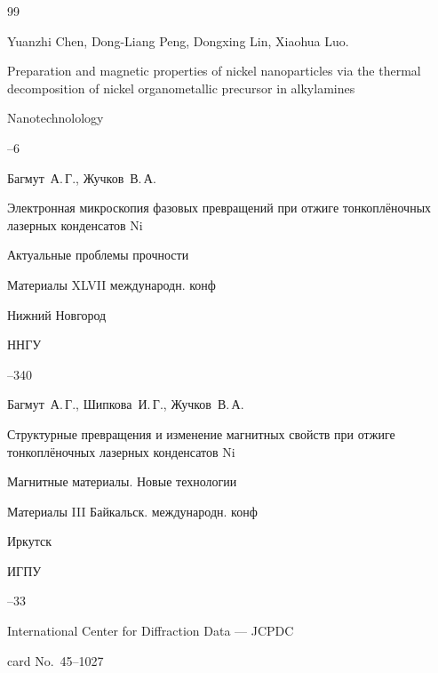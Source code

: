 \begin{thebibliography}{99}

\by Yuanzhi Chen, Dong-Liang Peng, Dongxing Lin, Xiaohua Luo.

\paper Preparation and magnetic properties of nickel nanoparticles via the thermal decomposition of nickel organometallic precursor in alkylamines

\jour Nanotechnolology




--6





\by Багмут~А.\,Г., Жучков~В.\,А.

\paper Электронная микроскопия фазовых превращений при отжиге тонкоплёночных лазерных конденсатов Ni

\inbook Актуальные проблемы прочности

\bookinfo Материалы XLVII международн. конф


\publaddr Нижний Новгород

\publ ННГУ


--340




\by Багмут~А.\,Г., Шипкова~И.\,Г., Жучков~В.\,А.

\paper  Структурные превращения и изменение магнитных свойств при отжиге тонкоплёночных лазерных конденсатов Ni

\inbook Магнитные материалы. Новые технологии

\bookinfo Материалы III Байкальск. международн. конф

\publaddr  Иркутск

\publ ИГПУ


--33






\book International Center for Diffraction Data --- JCPDC


\finalinfo card No.~45--1027





\end{thebibliography}
